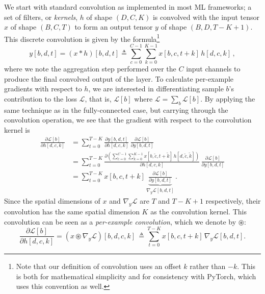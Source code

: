 \documentclass[11pt]{article}
\begin{document}
We start with standard convolution as implemented in most ML frameworks;
a set of filters, or \emph{kernels}, $h$ of shape $(D, C, K)$
is convolved with the input tensor $x$ of shape $(B, C, T)$ to form an output
tensor $y$ of shape $(B, D, T-K+1)$. This discrete convolution is given by the
formula\footnote{Note
that our definition of convolution uses an offset $k$ rather than $-k$. This
is both for mathematical simplicity and for consistency with PyTorch, which
uses this convention as well.}
\begin{equation}
    \label{eq:convolution}
    y[b, d, t] = (x \ast h)[b, d, t] \triangleq \sum_{c=0}^{C-1} \sum_{k=0}^{K-1} x[b, c, t+k] \, h[d, c, k] \, ,
\end{equation}
where we note the aggregation step performed over the $C$ input channels to
produce the final convolved output of the layer.
To calculate per-example gradients with respect to $h$,  
we are interested in differentiating sample $b$'s contribution to the loss
$\mathcal L$, that is, $\mathcal L[b]$ where $\mathcal L = \sum_b \mathcal
L[b]$. By applying the same technique as in the fully-connected case, but carrying
through the convolution operation, we see that the gradient with respect to the convolution kernel is
\begin{align*}
    \frac{\partial \mathcal L[b]}{\partial h[d, c, k]}
    &= \sum_{t=0}^{T-K} \frac{\partial y[b, d, t]}{\partial h[d, c, k]}
        \, \frac{\partial \mathcal L[b]}{\partial y[b, d, t]} \\
    &= \sum_{t=0}^{T-K} \frac{\partial \left( \sum_{\tilde c=0}^{C-1}
        \sum_{\tilde k=0}^{K-1} x[b, \tilde c, t+\tilde k] \, h[d, \tilde c,
        \tilde k] \right)}{\partial h[d, c, k]} \, \frac{\partial \mathcal
        L[b]}{\partial y[b, d, t]} \\
    &= \sum_{t=0}^{T-K} x[b, c, t+k] \, \underbrace{\frac{\partial \mathcal
        L[b]}{\partial y[b, d, t]}}_{\nabla_y \mathcal{L} [b, d, t]} \, .
\end{align*}
Since the spatial dimensions of $x$ and $\nabla_y \mathcal{L}$ are
$T$ and $T-K+1$ respectively, their convolution has the same spatial dimension $K$ as the
convolution kernel. This convolution can be seen as a \emph{per-example
convolution}, which we denote by $\circledast$:
\begin{equation}
    \frac{\partial \mathcal L[b]}{\partial h[d, c, k]} = \left( x
    \circledast \nabla_y \mathcal{L} \right)[b, d, c, k] \, \triangleq
    \sum_{t=0}^{T-K} x[b, c, t+k] \, \nabla_y \mathcal{L} [b, d, t].
    \label{eq:formula}
\end{equation}
\end{document}
